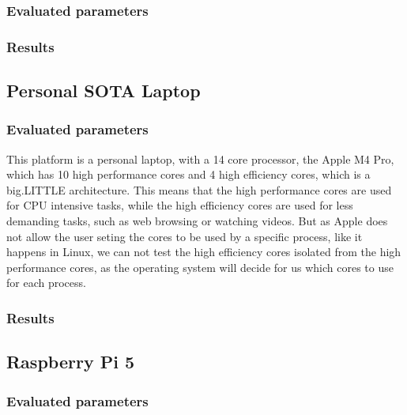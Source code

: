 \subsubsection{Evaluated parameters}
\subsubsection{Results}

\subsection{Personal SOTA Laptop}
\subsubsection{Evaluated parameters}

This platform is a personal laptop, with a 14 core processor, the Apple M4 Pro, which has 10 high performance cores and 4 high efficiency cores, which is a big.LITTLE architecture. This means that the high performance cores are used for CPU intensive tasks, while the high efficiency cores are used for less demanding tasks, such as web browsing or watching videos. But as Apple does not allow the user seting the cores to be used by a specific process, like it happens in Linux, we can not test the high efficiency cores isolated from the high performance cores, as the operating system will decide for us which cores to use for each process. 



\subsubsection{Results}





\subsection{Raspberry Pi 5}
\subsubsection{Evaluated parameters}
